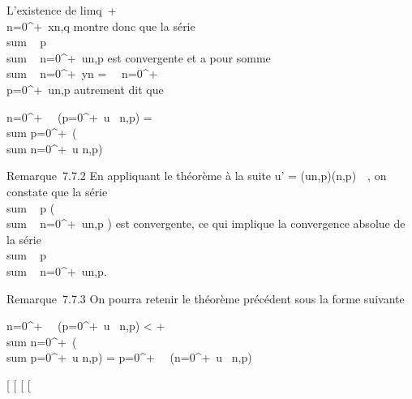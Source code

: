 L'existence de
limq\rightarrow~+\infty~~\\\sum
 n=0^+\infty~xn,q montre donc que la série
\\sum ~
p \\sum ~
n=0^+\infty~un,p est convergente et a pour somme
\\sum ~
n=0^+\infty~yn =\
\sum ~
n=0^+\infty~\\\sum
 p=0^+\infty~un,p autrement dit que

\sum n=0^+\infty~~\left
(\sum p=0^+\infty~u~
n,p\right ) = \\sum
p=0^+\infty~\left (\\sum
n=0^+\infty~u n,p\right )

Remarque~7.7.2 En appliquant le théorème à la suite u' =
(\textbar{}un,p\textbar{})(n,p)\in{}~\times{}~, on constate que
la série \\sum ~
p\left
(\\sum ~
n=0^+\infty~\textbar{}un,p\textbar{}\right
) est convergente, ce qui implique la convergence absolue de la série
\\sum ~
p \\sum ~
n=0^+\infty~un,p.

Remarque~7.7.3 On pourra retenir le théorème précédent sous la forme
suivante

\sum n=0^+\infty~~\left
(\sum p=0^+\infty~\textbar{}u~
n,p\textbar{}\right ) \textless{}
+\infty~\rigtharrow~\\sum
n=0^+\infty~\left (\\sum
p=0^+\infty~u n,p\right ) =
\sum p=0^+\infty~~\left
(\sum n=0^+\infty~u~
n,p\right )

{[}
{[}
{[}
{[}
